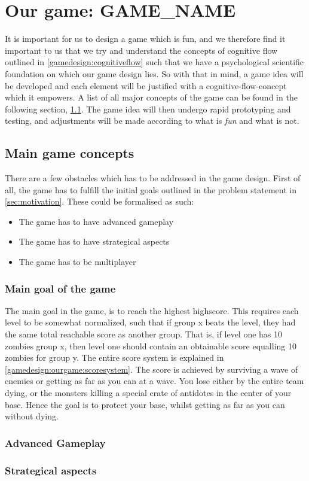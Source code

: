 \section{Our game: GAME\_NAME}
It is important for us to design a game which is fun, and we therefore find it important to us that we try and
understand the concepts of cognitive flow outlined in \ref{gamedesign:cognitiveflow} such that we have a psychological
scientific foundation on which our game design lies.  So with that in mind, a game idea will be developed and each
element will be justified with a cognitive-flow-concept which it empowers. A list of all major concepts of the game can
be found in the following section, \ref{gamedesign:maingameconcepts}.  The game idea will then undergo rapid
prototyping and testing, and adjustments will be made according to what is \emph{fun} and what is not.

\subsection{Main game concepts}\label{gamedesign:maingameconcepts}
There are a few obstacles which has to be addressed in the game design. First of all, the game has to fulfill the
initial goals outlined in the problem statement in \ref{sec:motivation}. These could be formalised as such:

\begin{itemize}
    \item The game has to have advanced gameplay
    \item The game has to have strategical aspects
    \item The game has to be multiplayer
\end{itemize}

\subsubsection{Main goal of the game}
The main goal in the game, is to reach the highest highscore. This requires each level to be somewhat normalized, such
that if group x beats the level, they had the same total reachable score as another group. That is, if level one has 10
zombies group x, then level one should contain an obtainable score equalling 10 zombies for group y. The entire score
system is explained in \ref{gamedesign:ourgame:scoresystem}. The score is achieved by surviving a wave of enemies or
getting as far as you can at a wave. You lose either by the entire team dying, or the monsters killing a special
crate of antidotes in the center of your base. Hence the goal is to protect your base, whilst getting as far as you can
without dying.

\subsubsection{Advanced Gameplay}


\subsubsection{Strategical aspects}

